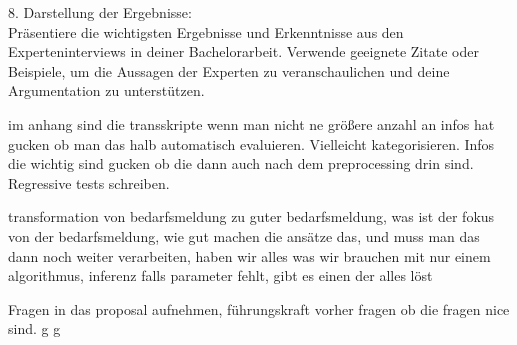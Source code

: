 8. Darstellung der Ergebnisse:\\
Präsentiere die wichtigsten Ergebnisse und Erkenntnisse aus den Experteninterviews in deiner Bachelorarbeit. Verwende geeignete Zitate oder Beispiele, um die Aussagen der Experten zu veranschaulichen und deine Argumentation zu unterstützen.
\cite{maguire2002user}

im anhang sind die transskripte
wenn man nicht ne größere anzahl an infos hat gucken ob man das halb automatisch evaluieren. Vielleicht kategorisieren. Infos die wichtig sind gucken ob die dann auch nach dem preprocessing drin sind. Regressive tests schreiben.

transformation von bedarfsmeldung zu guter bedarfsmeldung, was ist der fokus von der bedarfsmeldung, wie gut machen die ansätze das, und muss man das dann noch weiter verarbeiten, haben wir alles was wir brauchen mit nur einem algorithmus, inferenz falls parameter fehlt, gibt es einen der alles löst

Fragen in das proposal aufnehmen, führungskraft vorher fragen ob die fragen nice sind.
\newpage
g
\newpage
g
\newpage